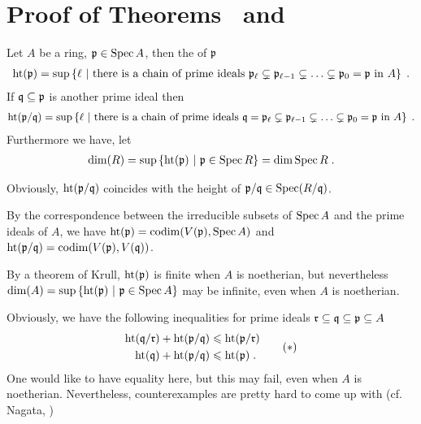 \documentclass[a4paper,parskip=half,numbers=enddot, DIV=12]{scrreprt}
\renewcommand{\leq}{\leqslant}
\begin{document}
\section[Proof of Theorems \getrefnumber{thm:k^nIsCatenary} and \getrefnumber{thm:quotienFieldOfRegularFunctions}]{Proof of Theorems~ and~}%
	\begin{defi}
		Let $A$ be a ring, $\mathfrak{p}\in\operatorname{Spec} A$, then the  of $\mathfrak{p}$  
		\begin{align*}
			\operatorname{ht}(\mathfrak{p}) = \sup\left\{\ell\ \middle|\ \text{there is a chain of prime ideals } \mathfrak{p}_\ell\subsetneq \mathfrak{p}_{\ell-1}\subsetneq \ldots\subsetneq \mathfrak{p}_0 =\mathfrak{p}\text{ in }A\right\}\;.
		\end{align*}
		If $\mathfrak{q}\subseteq\mathfrak{p}$ is another prime ideal then
		\begin{align*}
			\operatorname{ht}(\mathfrak{p}/\mathfrak{q}) = \sup\left\{\ell\ \middle|\ \text{there is a chain of prime ideals } \mathfrak{q}=\mathfrak{p}_\ell\subsetneq \mathfrak{p}_{\ell-1}\subsetneq \ldots\subsetneq \mathfrak{p}_0 =\mathfrak{p}\text{ in }A\right\}\;.
		\end{align*}
		Furthermore we have, let
		\begin{align*}
			\dim (R) = \sup\left\{\operatorname{ht}(\mathfrak{p})\ \middle|\ \mathfrak{p}\in\operatorname{Spec} R\right\} = \dim\operatorname{Spec} R\;.
		\end{align*}

	\end{defi}
	\begin{rem}
		\begin{alphanumerate}
		\item 
			Obviously, $\operatorname{ht}(\mathfrak{p}/\mathfrak{q})$ coincides with the height of $\mathfrak{p}/\mathfrak{q}\in\operatorname{Spec}(R/\mathfrak{q})$.
		\item 
			By the correspondence between the irreducible subsets of $\operatorname{Spec} A$ and the prime ideals of $A$, we have $\operatorname{ht}(\mathfrak{p}) = \operatorname{codim}(V(\mathfrak{p}), \operatorname{Spec} A)$ and $\operatorname{ht}(\mathfrak{p}/\mathfrak{q}) = \operatorname{codim}(V(\mathfrak{p}),V(\mathfrak{q}))$.
		\item 
			By a theorem of Krull, $\operatorname{ht}(\mathfrak{p})$ is finite when $A$ is noetherian, but nevertheless $\dim (A) = \sup\left\{\operatorname{ht}(\mathfrak{p})\ \middle|\ \mathfrak{p}\in\operatorname{Spec} A \right\}$ may be infinite, even when $A$ is noetherian.
		\item 
			Obviously, we have the following inequalities for prime ideals $\mathfrak{r}\subseteq\mathfrak{q}\subseteq\mathfrak{p}\subseteq A$
			\begin{align}\lbl{eq:heightIneqs}
				\begin{split}
					\hoehe(\qq/\rr)+\hoehe(\pp/\qq) &\leq\hoehe(\pp/\rr)\\
					\hoehe(\qq)+\hoehe(\pp/\qq) &\leq \hoehe(\pp)\;.
				\end{split}\tag{$*$}
			\end{align}
			One would like to have equality here, but this may fail, even when $A$ is noetherian. Nevertheless, counterexamples are pretty hard to come up with (cf. Nagata, \cite{nagata})
		\end{alphanumerate}
	\end{rem}
\end{document}
